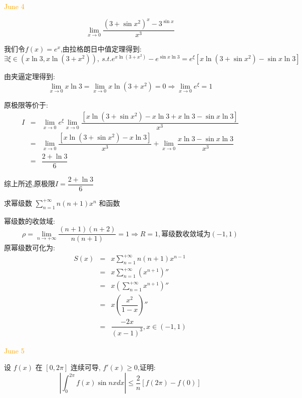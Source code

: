 \textcolor{orange}{June 4}

\begin{example}[][Exam: 32.1.6]
	$$\lim\limits_{x\to 0}\dfrac{(3+\sin x^2)^{x}-3^{\sin x}}{x^3}$$
\end{example}

\begin{solution}
	
	我们令$f(x)=e^x$,由拉格朗日中值定理得到: 
	$$\exists \xi\in(x\ln 3,x\ln(3+x^2)),\ s.t. e^{x\ln(3+x^2)}-e^{\sin x\ln 3}=e^{\xi}[x\ln(3+\sin x^2)-\sin x\ln 3]$$
	
	由夹逼定理得到: 
	$$\lim\limits_{x\to 0 }x\ln 3=\lim\limits_{x\to 0 }x\ln(3+x^2)=0\Rightarrow \lim\limits_{x\to 0 }e^{\xi}=1$$
	
	原极限等价于: 
	\begin{eqnarray*}
		I&=&\lim\limits_{x\to 0}e^{\xi}\lim\limits_{x\to 0}\dfrac{[x\ln(3+\sin x^2)-x\ln 3+x\ln 3-\sin x\ln 3]}{x^3}\\
		&=&\lim\limits_{x\to 0}\dfrac{[x\ln(3+\sin x^2)-x\ln 3]}{x^3}+\lim\limits_{x\to 0}\dfrac{x\ln 3-\sin x\ln 3}{x^3}\\
		&=&\dfrac{2+\ln 3}{6}
	\end{eqnarray*}
	
	综上所述,原极限$I=\dfrac{2+\ln 3}{6}$
\end{solution}

\begin{example}[][Exam: 32.1.7]
	求幂级数 $\sum\limits_{n=1}^{+\infty}n(n+1)x^n$ 和函数
\end{example}

\begin{solution}
	
	幂级数的收敛域: 
	$$\rho=\lim\limits_{n\to+\infty}\dfrac{(n+1)(n+2)}{n(n+1)}=1\Rightarrow R=1,\text{幂级数收敛域为}(-1,1)$$
	原幂级数可化为: 
	\begin{eqnarray*}
		S(x)&=&x\sum\limits_{n=1}^{+\infty}n(n+1)x^{n-1}\\&=&x\sum\limits_{n=1}^{+\infty}(x^{n+1})''\\&=&x\left( \sum\limits_{n=1}^{+\infty}x^{n+1}\right) ''\\
		&=&x\left( \dfrac{x^2}{1-x}\right) ''\\
		&=&\dfrac{-2x}{(x-1)^3},x\in(-1,1)
	\end{eqnarray*}
\end{solution}


\textcolor{orange}{June 5}

\begin{example}[][Exam: 32.1.8]
	设 $f(x)$ 在 $[0,2\pi]$ 连续可导, $f'(x)\geq 0$,证明: 
$$\left| \int_{0}^{2\pi}f(x)\sin nxdx\right|\leq \dfrac{2}{n}[f(2\pi)-f(0)] $$
\end{example}

